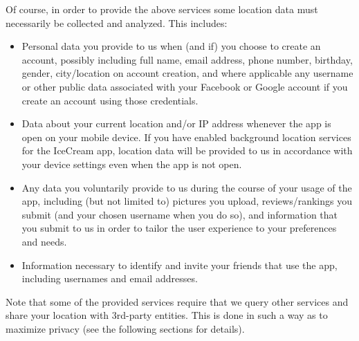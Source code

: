 \documentclass{article}
\providecommand{\tightlist}{
    \setlength{\itemsep}{0pt}\setlength{\parskip}{0pt}
}
\begin{document}
Of course, in order to provide the above services some location data must necessarily be collected and analyzed. This includes:
\begin{itemize}\tightlist
  \item Personal data you provide to us when (and if) you choose to create an account, possibly including full name, email address, phone number, birthday, gender, city/location on account creation, and where applicable any username or other public data associated with your Facebook or Google account if you create an account using those credentials.
  \item Data about your current location and/or IP address whenever the app is open on your mobile device. If you have enabled background location services for the IceCream app, location data will be provided to us in accordance with your device settings even when the app is not open.
  \item Any data you voluntarily provide to us during the course of your usage of the app, including (but not limited to) pictures you upload, reviews/rankings you submit (and your chosen username when you do so), and information that you submit to us in order to tailor the user experience to your preferences and needs.
  \item Information necessary to identify and invite your friends that use the app, including usernames and email addresses.
\end{itemize}

Note that some of the provided services require that we query other services and share your location with 3rd-party entities. This is done in such a way as to maximize privacy (see the following sections for details).
\end{document}
